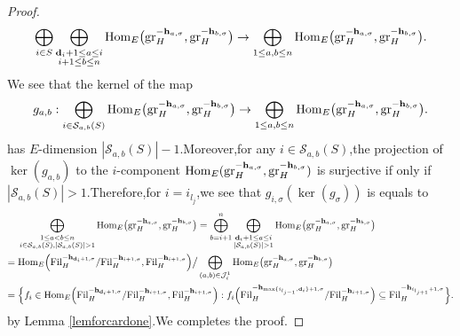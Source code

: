 \documentclass[10pt]{article}
\newcommand{\fil}{{\rm Fil}}
\newcommand{\homo}{{\rm Hom}}
\newcommand{\gr}{{\rm gr}}
\newcommand{\bh}{{\mathbf{h}}}
\newcommand{\bd}{{\mathbf{d}}}
\newcommand{\cS}{\mathcal S}
\newcommand{\cJ}{\mathcal J}
\begin{document}
\begin{proof}
\[ \bigoplus_{i\in S}\bigoplus_{\substack{\bd_i+1\leq a\leq i\\i+1\leq b\leq n}}\homo_E\big(\gr_H^{-\bh_{a,\sigma}},\gr_H^{-\bh_{b,\sigma}}\big)\rightarrow \bigoplus_{1\leq a,b\leq n}\homo_E\big(\gr_H^{-\bh_{a,\sigma}},\gr_H^{-\bh_{b,\sigma}}\big).\]
We see that the kernel of the map 
\[g_{a,b}:\bigoplus_{i\in \cS_{a,b}(S)}\homo_E\big(\gr_H^{-\bh_{a,\sigma}},\gr_H^{-\bh_{b,\sigma}}\big)\rightarrow \bigoplus_{1\leq a,b\leq n}\homo_E\big(\gr_H^{-\bh_{a,\sigma}},\gr_H^{-\bh_{b,\sigma}}\big).\]
has $E$-dimension $|\cS_{a,b}(S)|-1$.\;Moreover,\;for any $i\in \cS_{a,b}(S)$,\;the projection of  $\ker(g_{a,b})$ to the  $i$-component $\homo_E(\gr_H^{-\bh_{a,\sigma}},\gr_H^{-\bh_{b,\sigma}})$ is surjective if only if $|\cS_{a,b}(S)|>1$.\;Therefore,\;for $i=i_{l_j}$,\;we see that $g_{i,\sigma}(\ker (g_{\sigma}))$ is equals to
\begin{equation*}
	\begin{aligned}
		&\;\bigoplus_{\substack{1\leq a<b\leq n\\i\in \cS_{a,b}(S),|\cS_{a,b}(S)|>1}}\homo_E\big(\gr_H^{-\bh_{a,\sigma}},\gr_H^{-\bh_{b,\sigma}}\big)=\bigoplus_{b=i+1}^n\bigoplus_{\substack{\bd_i+1\leq a\leq i\\ |\cS_{a,b}(S)|>1}}\homo_E\big(\gr_H^{-\bh_{a,\sigma}},\gr_H^{-\bh_{b,\sigma}}\big)\\
       		=&\;\homo_E\Big(\fil_H^{-\bh_{\bd_i+1,\sigma}}/\fil_H^{-\bh_{i+1,\sigma}},\fil_H^{-\bh_{i+1,\sigma}}\Big)\big/\bigoplus_{(a,b)\in\cJ^1_i}\homo_E\big(\gr_H^{-\bh_{a,\sigma}},\gr_H^{-\bh_{b,\sigma}}\big)\\
       	=&\;\Big\{f_i\in\homo_E\Big(\fil_H^{-\bh_{\bd_i+1,\sigma}}/\fil_H^{-\bh_{i+1,\sigma}},\fil_H^{-\bh_{i+1,\sigma}}\Big):f_i\Big(\fil_H^{-\bh_{{\max\{i_{l_{j-1}},\bd_i\}}+1,\sigma}}/\fil_H^{-\bh_{i+1,\sigma}}\Big)\subseteq\fil_H^{-\bh_{i_{l_{j+1}}+1,\sigma}}\Big\}.
	\end{aligned}
\end{equation*}
by Lemma \ref{lemforcardone}.\;We completes the proof.\;
\end{proof}	
\end{document}
